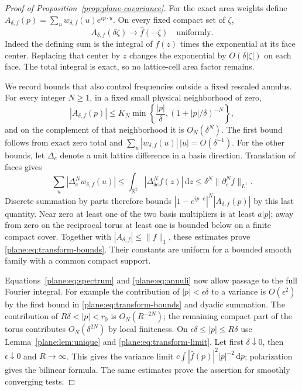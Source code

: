 \documentclass[11pt]{article}
\newcommand{\R}{\mathbb R}
\newcommand{\dd}{\,\mathrm d}
\theoremstyle{definition}
\theoremstyle{remark}
\numberwithin{equation}{section}
\begin{document}
\begin{proof}[Proof of Proposition~\ref{prop:plane-covariance}]
For the exact area weights define
$A_{\delta,f}(p)=\sum_uw_{\delta,f}(u)e^{ip\cdot u}$.
On every fixed compact set of $\zeta$,
\begin{equation}
 \label{plane:eq:transform-limit}
 A_{\delta,f}(\delta\zeta)\longrightarrow\widehat f(-\zeta)
 \quad\text{uniformly}.
\end{equation}
Indeed the defining sum is the integral of $f(z)$ times the
exponential at its face center.  Replacing that center by $z$
changes the exponential by $O(\delta|\zeta|)$ on each face.
The total integral is exact, so no lattice-cell area factor remains.

We record bounds that also control frequencies outside a fixed
rescaled annulus.  For every integer $N\ge1$, in a fixed small
physical neighborhood of zero,
\begin{equation}
 \label{plane:eq:transform-bounds}
 |A_{\delta,f}(p)|\le K_N
       \min\left\{\frac{|p|}{\delta},
                    (1+|p|/\delta)^{-N}\right\},
\end{equation}
and on the complement of that neighborhood it is $O_N(\delta^N)$.
The first bound follows from exact zero total and
$\sum_u|w_{\delta,f}(u)|\,|u|=O(\delta^{-1})$.
For the other bounds, let $\Delta_e$ denote a unit lattice difference
in a basis direction.  Translation of faces gives
\[
 \sum_u|\Delta_e^Nw_{\delta,f}(u)|
   \le\int_{\R^2}|\Delta_{\delta e}^N f(z)|\dd z
   \le\delta^N\|\partial_e^N f\|_{L^1}.
\]
Discrete summation by parts therefore bounds
$|1-e^{ip\cdot e}|^N|A_{\delta,f}(p)|$ by this last quantity.
Near zero at least one of the two basis multipliers is at least
$a|p|$; away from zero on the reciprocal torus at least one is bounded
below on a finite compact cover.  Together with
$|A_{\delta,f}|\le\|f\|_1$, these estimates prove
\eqref{plane:eq:transform-bounds}.  Their constants are uniform for
a bounded smooth family with a common compact support.

Equations~\eqref{plane:eq:spectrum} and
\eqref{plane:eq:annuli} now allow passage to the full Fourier integral.
For example the contribution of $|p|<\epsilon\delta$ to a variance
is $O(\epsilon^2)$ by the first bound in
\eqref{plane:eq:transform-bounds} and dyadic summation.
The contribution of $R\delta<|p|<r_0$ is $O_N(R^{-2N})$;
the remaining compact part of the torus contributes $O_N(\delta^{2N})$
by local finiteness.  On $\epsilon\delta\le|p|\le R\delta$ use
Lemma~\ref{plane:lem:unique} and \eqref{plane:eq:transform-limit}.
Let first $\delta\downarrow0$, then $\epsilon\downarrow0$ and
$R\to\infty$.  This gives the variance limit
$c\int|\widehat f(p)|^2|p|^{-2}\dd p$; polarization gives the
bilinear formula.  The same estimates prove the assertion for
smoothly converging tests.


\end{proof}
\end{document}
